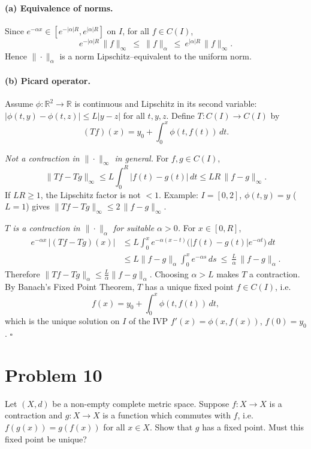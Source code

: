 \documentclass[12pt,a4paper]{article}
\newcommand{\qed}{\hfill$\square$}
\theoremstyle{plain}
\theoremstyle{definition}
\theoremstyle{remark}
\theoremstyle{remark}
\begin{document}
\paragraph{(a) Equivalence of norms.}
Since $e^{-\alpha x}\in [e^{-|\alpha|R},e^{|\alpha|R}]$ on $I$, for all $f\in C(I)$,
\[
e^{-|\alpha|R}\,\|f\|_\infty \ \le\ \|f\|_\alpha \ \le\ e^{|\alpha|R}\,\|f\|_\infty.
\]
Hence $\|\cdot\|_\alpha$ is a norm Lipschitz–equivalent to the uniform norm.

\paragraph{(b) Picard operator.}
Assume $\phi:\mathbb R^2\to\mathbb R$ is continuous and Lipschitz in its second variable:
$|\phi(t,y)-\phi(t,z)|\le L|y-z|$ for all $t,y,z$.
Define $T:C(I)\to C(I)$ by
\[
(Tf)(x)=y_0+\int_0^x \phi(t,f(t))\,dt .
\]

\emph{Not a contraction in $\|\cdot\|_\infty$ in general.}
For $f,g\in C(I)$,
\[
\|Tf-Tg\|_\infty\le L\!\int_0^R |f(t)-g(t)|\,dt \le LR\,\|f-g\|_\infty .
\]
If $LR\ge1$, the Lipschitz factor is not $<1$. Example: $I=[0,2]$, $\phi(t,y)=y$ ($L=1$) gives
$\|Tf-Tg\|_\infty\le 2\,\|f-g\|_\infty$.

\emph{$T$ is a contraction in $\|\cdot\|_\alpha$ for suitable $\alpha>0$.}
For $x\in[0,R]$,
\[
\begin{aligned}
	e^{-\alpha x}\,|(Tf-Tg)(x)|
	&\le L\int_0^x e^{-\alpha(x-t)}\big(|f(t)-g(t)|e^{-\alpha t}\big)\,dt \\
	&\le L\|f-g\|_\alpha \int_0^x e^{-\alpha s}\,ds
	\ \le\ \frac{L}{\alpha}\,\|f-g\|_\alpha .
\end{aligned}
\]
Therefore $\|Tf-Tg\|_\alpha \le \frac{L}{\alpha}\|f-g\|_\alpha$. Choosing $\alpha>L$ makes $T$ a contraction.
By Banach’s Fixed Point Theorem, $T$ has a unique fixed point $f\in C(I)$, i.e.
\[
f(x)=y_0+\int_0^x \phi(t,f(t))\,dt ,
\]
which is the unique solution on $I$ of the IVP $f'(x)=\phi(x,f(x))$, $f(0)=y_0$.
\qed

\section*{Problem 10}
Let $(X,d)$ be a non-empty complete metric space. Suppose $f:X\to X$ is a contraction and
$g:X\to X$ is a function which commutes with $f$, i.e.\ $f(g(x))=g(f(x))$ for all $x\in X$.
Show that $g$ has a fixed point. Must this fixed point be unique?

\bigskip
\end{document}
